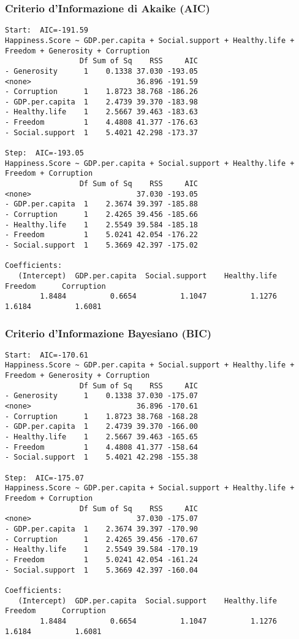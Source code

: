 \documentclass{beamer}
\begin{document}
\begin{frame}[fragile]
    \frametitle{Criterio d'Informazione di Akaike (AIC)}
    \tiny
    \begin{verbatim}
Start:  AIC=-191.59
Happiness.Score ~ GDP.per.capita + Social.support + Healthy.life + Freedom + Generosity + Corruption
                 Df Sum of Sq    RSS     AIC
- Generosity      1    0.1338 37.030 -193.05
<none>                        36.896 -191.59
- Corruption      1    1.8723 38.768 -186.26
- GDP.per.capita  1    2.4739 39.370 -183.98
- Healthy.life    1    2.5667 39.463 -183.63
- Freedom         1    4.4808 41.377 -176.63
- Social.support  1    5.4021 42.298 -173.37

Step:  AIC=-193.05
Happiness.Score ~ GDP.per.capita + Social.support + Healthy.life + Freedom + Corruption
                 Df Sum of Sq    RSS     AIC
<none>                        37.030 -193.05
- GDP.per.capita  1    2.3674 39.397 -185.88
- Corruption      1    2.4265 39.456 -185.66
- Healthy.life    1    2.5549 39.584 -185.18
- Freedom         1    5.0241 42.054 -176.22
- Social.support  1    5.3669 42.397 -175.02

Coefficients:
   (Intercept)  GDP.per.capita  Social.support    Healthy.life         Freedom      Corruption  
        1.8484          0.6654          1.1047          1.1276          1.6184          1.6081  
    \end{verbatim}
\end{frame}

\begin{frame}[fragile]
    \frametitle{Criterio d'Informazione Bayesiano (BIC)}
    \tiny
    \begin{verbatim}
Start:  AIC=-170.61
Happiness.Score ~ GDP.per.capita + Social.support + Healthy.life + Freedom + Generosity + Corruption
                 Df Sum of Sq    RSS     AIC
- Generosity      1    0.1338 37.030 -175.07
<none>                        36.896 -170.61
- Corruption      1    1.8723 38.768 -168.28
- GDP.per.capita  1    2.4739 39.370 -166.00
- Healthy.life    1    2.5667 39.463 -165.65
- Freedom         1    4.4808 41.377 -158.64
- Social.support  1    5.4021 42.298 -155.38

Step:  AIC=-175.07
Happiness.Score ~ GDP.per.capita + Social.support + Healthy.life + Freedom + Corruption
                 Df Sum of Sq    RSS     AIC
<none>                        37.030 -175.07
- GDP.per.capita  1    2.3674 39.397 -170.90
- Corruption      1    2.4265 39.456 -170.67
- Healthy.life    1    2.5549 39.584 -170.19
- Freedom         1    5.0241 42.054 -161.24
- Social.support  1    5.3669 42.397 -160.04

Coefficients:
   (Intercept)  GDP.per.capita  Social.support    Healthy.life         Freedom      Corruption  
        1.8484          0.6654          1.1047          1.1276          1.6184          1.6081
    \end{verbatim}

\end{frame}
\end{document}
